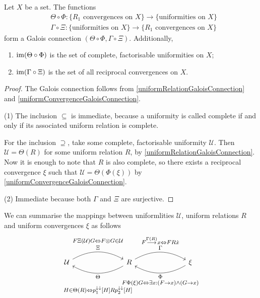 \begin{corollary}
Let $X$ be a set. The functions
\begin{align*}
&\Theta \circ \Phi: \{\text{$R_1$ convergences on $X$}\} \to \{\text{uniformities on $X$}\} \\
&\Gamma\circ \Xi: \{\text{uniformities on $X$}\} \to \{\text{$R_1$ convergences on $X$}\}
\end{align*}
form a Galois connection $(\Theta \circ \Phi, \Gamma\circ \Xi)$. Additionally,
\begin{enumerate}
\item $\operatorname{im}(\Theta \circ \Phi)$ is the set of complete, factorisable uniformities on $X$;
\item $\operatorname{im}(\Gamma\circ \Xi)$ is the set of all reciprocal convergences on $X$.
\end{enumerate}
\end{corollary}
\begin{proof}
The Galois connection follows from \ref{uniformRelationGaloisConnection} and \ref{uniformConvergenceGaloisConnection}.

(1) The inclusion $\subseteq$ is immediate, because a uniformity is called complete if and only if its associated uniform relation is complete.

For the inclusion $\supseteq$, take some complete, factorisable uniformity $\mathcal{U}$. Then $\mathcal{U} = \Theta(R)$ for some uniform relation $R$, by \ref{uniformRelationGaloisConnection}. Now it is enough to note that $R$ is also complete, so there exists a reciprocal convergence $\xi$ such that $\mathcal{U} = \Theta(\Phi(\xi))$ by \ref{uniformConvergenceGaloisConnection}.

(2) Immediate because both $\Gamma$ and $\Xi$ are surjective.
\end{proof}

We can summarise the mappings between uniformlities $\mathcal{U}$, uniform relations $R$ and uniform convergences $\xi$ as follows
\[ \begin{tikzcd}[labels = {font=\large}]
\mathcal{U} \arrow[bend left, rrr, "\substack{F\mathrel{\Xi(\mathcal{U})}G \Leftrightarrow F\otimes G\in \mathcal{U} \vspace{0.1em} \\ \vspace{0.1em} \Xi}"] &&& \arrow[lll, bend left, "\substack{\Theta \vspace{0.8em} \\ H\in\Theta(R) \Leftrightarrow p_1^{\imf\imf}[H]\mathrel{R}p_2^{\imf\imf}[H]}"] R \arrow[rrr, bend left, "\substack{F\overset{\Gamma(R)}{\longrightarrow} x \Leftrightarrow F\mathrel{R}\pfilter{x} \vspace{0.1em} \\ \vspace{0.1em} \Gamma}"] &&& \arrow[lll, bend left, "\substack{\Phi \vspace{0.1em} \\ F\mathrel{\Phi(\xi)}G \Leftrightarrow \exists x: (F\to x)\land (G\to x)}"] \xi
\end{tikzcd} \]

